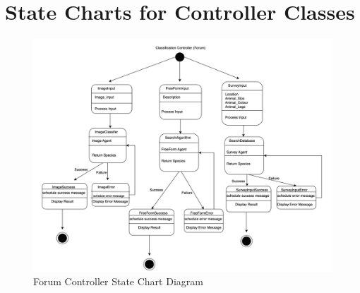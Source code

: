 \documentclass[]{article}
\numberwithin{figure}{section}
\begin{document}

\section{State Charts for Controller Classes}
\label{sec:state_charts_for_controller_classes}

\begin{figure}[h]
    \centering
    \includegraphics[scale=0.5]{Forum.png}
    \caption{Forum Controller State Chart Diagram}
    \label{fig:forum_controller}
\end{figure}
\clearpage 
\end{document}
